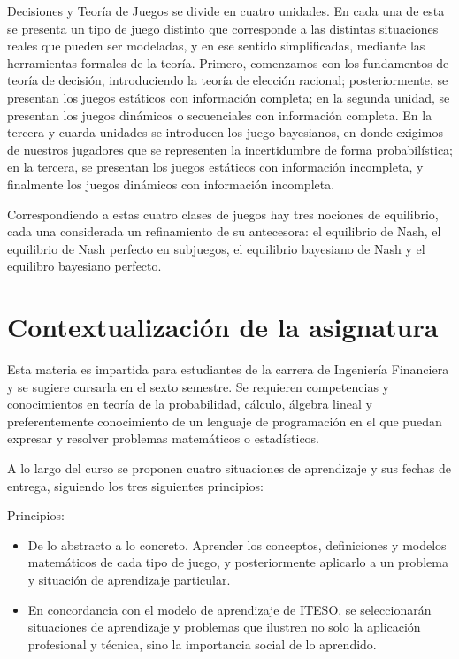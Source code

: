 \documentclass[11pt]{article}
\begin{document}
Decisiones y Teoría de Juegos se divide en cuatro unidades. En cada una de esta se presenta un tipo de juego distinto que corresponde a las distintas situaciones reales que pueden ser modeladas, y en ese sentido simplificadas, mediante las herramientas formales de la teoría. Primero, comenzamos con los fundamentos de teoría de decisión, introduciendo la teoría de elección racional; posteriormente, se presentan los juegos estáticos con información completa; en la segunda unidad, se presentan los juegos dinámicos o secuenciales con información completa. En la tercera y cuarda unidades se introducen los juego bayesianos, en donde exigimos de nuestros jugadores que se representen la incertidumbre de forma probabilística; en la tercera, se presentan los juegos estáticos con información incompleta, y finalmente los juegos dinámicos con información incompleta.

Correspondiendo a estas cuatro clases de juegos hay tres nociones de equilibrio, cada una considerada un refinamiento de su antecesora: el equilibrio de Nash, el equilibrio de Nash perfecto en subjuegos, el equilibrio bayesiano de Nash y el equilibro bayesiano perfecto.

\section{Contextualización de la asignatura}

Esta materia es impartida para estudiantes de la carrera de Ingeniería Financiera y se sugiere cursarla en el sexto semestre. Se requieren competencias y conocimientos en teoría de la probabilidad, cálculo, álgebra lineal y preferentemente conocimiento de un lenguaje de programación en el que puedan expresar y resolver problemas matemáticos o estadísticos.

A lo largo del curso se proponen cuatro situaciones de aprendizaje y sus fechas de entrega, siguiendo los tres siguientes principios:

	\begin{mybox}{Principios:}
		\begin{itemize}
			\item De lo abstracto a lo concreto. Aprender los conceptos, definiciones y modelos matemáticos de cada tipo de juego, y posteriormente aplicarlo a un problema y situación de aprendizaje particular.
			\item En concordancia con el modelo de aprendizaje de ITESO, se seleccionarán situaciones de aprendizaje y problemas que ilustren no solo la aplicación profesional y técnica, sino la importancia social de lo aprendido.
		\end{itemize}
	\end{mybox}
\end{document}
